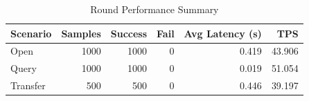 \begin{table}
\caption{Round Performance Summary}
\label{tab:round_perf}
\begin{tabular}{lrrrrr}
\toprule
Scenario & Samples & Success & Fail & Avg Latency (s) & TPS \\
\midrule
Open & 1000 & 1000 & 0 & 0.419 & 43.906 \\
Query & 1000 & 1000 & 0 & 0.019 & 51.054 \\
Transfer & 500 & 500 & 0 & 0.446 & 39.197 \\
\bottomrule
\end{tabular}
\end{table}
